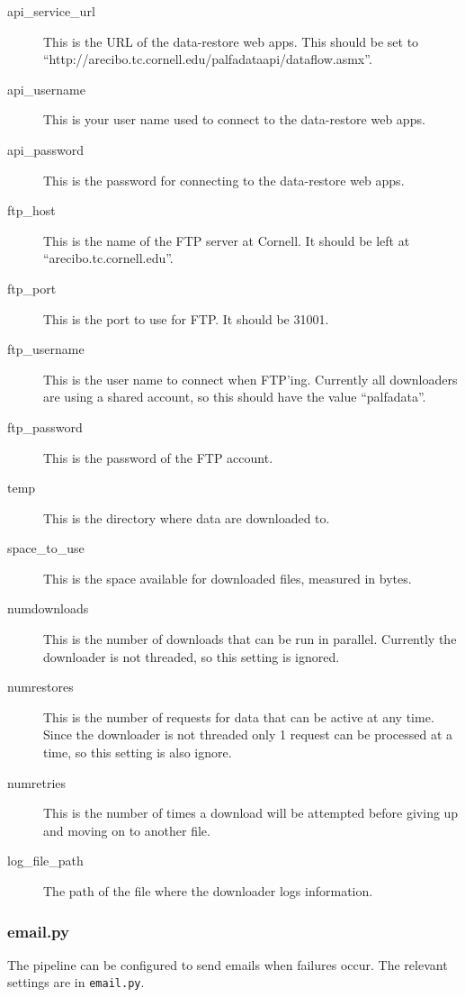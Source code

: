 \documentclass[12pt]{article}
\begin{document}
\begin{description}
    \item[api\_service\_url] This is the URL of the data-restore web apps. This should be set to ``http://arecibo.tc.cornell.edu/palfadataapi/dataflow.asmx''.
    \item[api\_username] This is your user name used to connect to the data-restore web apps.
    \item[api\_password] This is the password for connecting to the data-restore web apps.
    \item[ftp\_host] This is the name of the FTP server at Cornell. It should be left at ``arecibo.tc.cornell.edu''.
    \item[ftp\_port] This is the port to use for FTP. It should be 31001.
    \item[ftp\_username] This is the user name to connect when FTP'ing. Currently all downloaders are using a shared account, so this should have the value ``palfadata''.
    \item[ftp\_password] This is the password of the FTP account.
    \item[temp] This is the directory where data are downloaded to.
    \item[space\_to\_use] This is the space available for downloaded files, measured in bytes.
    \item[numdownloads] This is the number of downloads that can be run in parallel. Currently the downloader is not threaded, so this setting is ignored.
    \item[numrestores] This is the number of requests for data that can be active at any time. Since the downloader is not threaded only 1 request can be processed at a time, so this setting is also ignore.
    \item[numretries] This is the number of times a download will be attempted before giving up and moving on to another file.
    \item[log\_file\_path] The path of the file where the downloader logs information.
\end{description}


\subsubsection{email.py}
The pipeline can be configured to send emails when failures occur. The relevant settings are in \texttt{email.py}.
\end{document}
